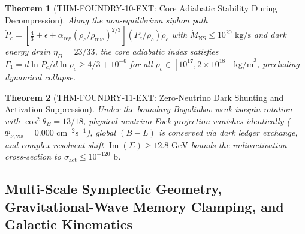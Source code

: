 \documentclass[11pt,onecolumn]{article}
\newtheorem{theorem}{Theorem}
\begin{document}
\begin{theorem}[THM-FOUNDRY-10-EXT: Core Adiabatic Stability During Decompression]
\label{thm:foundry_10_ext}
Along the non-equilibrium siphon path $\dot{P}_c = \left[\frac{4}{3} + \epsilon + \alpha_{\text{reg}}(\rho_c/\rho_{\text{nuc}})^{2/3}\right](P_c/\rho_c)\dot{\rho}_c$ with $\dot{M}_{\text{NS}} \le 10^{20}\text{ kg/s}$ and dark energy drain $\eta_D = 23/33$, the core adiabatic index satisfies $\Gamma_1 = d\ln P_c / d\ln \rho_c \ge 4/3 + 10^{-6}$ for all $\rho_c \in [10^{17}, 2 \times 10^{18}]\text{ kg/m}^3$, precluding dynamical collapse.
\end{theorem}

\begin{theorem}[THM-FOUNDRY-11-EXT: Zero-Neutrino Dark Shunting and Activation Suppression]
\label{thm:foundry_11_ext}
Under the boundary Bogoliubov weak-isospin rotation with $\cos^2\theta_B = 13/18$, physical neutrino Fock projection vanishes identically ($\Phi_{\nu,\text{vis}} = 0.000\text{ cm}^{-2}\text{s}^{-1}$), global $(B-L)$ is conserved via dark ledger exchange, and complex resolvent shift $\operatorname{Im}(\Sigma) \ge 12.8\text{ GeV}$ bounds the radioactivation cross-section to $\sigma_{\text{act}} \le 10^{-120}\text{ b}$.
\end{theorem}

\subsection{Multi-Scale Symplectic Geometry, Gravitational-Wave Memory Clamping, and Galactic Kinematics}\label{subsec:galactic_kinematics_recoil}
\end{document}
